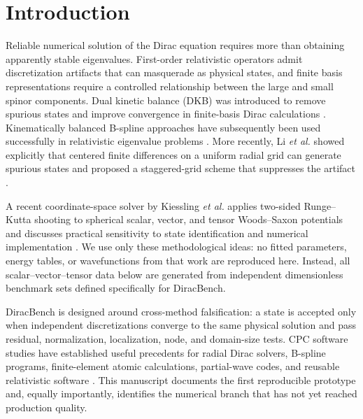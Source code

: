 \documentclass[a4paper,fleqn]{cas-dc}
\begin{document}
\section{Introduction}
Reliable numerical solution of the Dirac equation requires more than obtaining apparently stable eigenvalues. First-order relativistic operators admit discretization artifacts that can masquerade as physical states, and finite basis representations require a controlled relationship between the large and small spinor components. Dual kinetic balance (DKB) was introduced to remove spurious states and improve convergence in finite-basis Dirac calculations \cite{Shabaev2004,Beloy2008}. Kinematically balanced B-spline approaches have subsequently been used successfully in relativistic eigenvalue problems \cite{Fillion2012,Fischer2009,Toffoli2003,Poschl1998}. More recently, Li \emph{et al.} showed explicitly that centered finite differences on a uniform radial grid can generate spurious states and proposed a staggered-grid scheme that suppresses the artifact \cite{Li2026,FillionGourdeau2012,Lewin2010}.

A recent coordinate-space solver by Kiessling \emph{et al.} applies two-sided Runge--Kutta shooting to spherical scalar, vector, and tensor Woods--Saxon potentials and discusses practical sensitivity to state identification and numerical implementation \cite{Kiessling2025,FillionGourdeau2012,Beerwerth2015,Lorin2022}. We use only these methodological ideas: no fitted parameters, energy tables, or wavefunctions from that work are reproduced here. Instead, all scalar--vector--tensor data below are generated from independent dimensionless benchmark sets defined specifically for DiracBench.

DiracBench is designed around cross-method falsification: a state is accepted only when independent discretizations converge to the same physical solution and pass residual, normalization, localization, node, and domain-size tests. CPC software studies have established useful precedents for radial Dirac solvers, B-spline programs, finite-element atomic calculations, partial-wave codes, and reusable relativistic software \cite{Certik2013,Zatsarinny2016,Tsoulos2019,Waide2020,Certik2024,Elsepa2021,Poskus2018,Bagci2022}. This manuscript documents the first reproducible prototype and, equally importantly, identifies the numerical branch that has not yet reached production quality.
\end{document}
